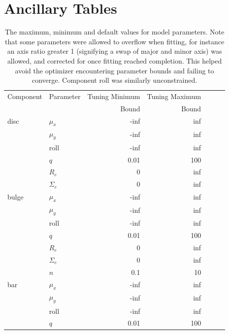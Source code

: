 \documentclass[../main.tex]{subfiles}
\begin{document}
\section{Ancillary Tables}
\begin{table}
  \centering
  \caption{The maximum, minimum and default values for model parameters. Note that some parameters were allowed to overflow when fitting, for instance an axis ratio greater 1 (signifying a swap of major and minor axis) was allowed, and corrected for once fitting reached completion. This helped avoid the optimizer encountering parameter bounds and failing to converge. Component roll was similarly unconstrained.}
  \begin{tabular}{l|l|r|r|r|r|r}
\hline
Component & Parameter  & Tuning Minimum & Tuning Maximum \\
          &            &  Bound         & Bound          \\
\hline
disc      & $\mu_x$    & -inf           & inf            \\
          & $\mu_y$    & -inf           & inf            \\
          & roll       & -inf           & inf            \\
          & $q$        & 0.01           & 100            \\
          & $R_e$      & 0              & inf            \\
          & $\Sigma_e$ & 0              & inf            \\
bulge     & $\mu_x$    & -inf           & inf            \\
          & $\mu_y$    & -inf           & inf            \\
          & roll       & -inf           & inf            \\
          & $q$        & 0.01           & 100            \\
          & $R_e$      & 0              & inf            \\
          & $\Sigma_e$ & 0              & inf            \\
          & $n$        & 0.1            & 10             \\
bar       & $\mu_x$    & -inf           & inf            \\
          & $\mu_y$    & -inf           & inf            \\
          & roll       & -inf           & inf            \\
          & $q$        & 0.01           & 100            \\

\end{tabular}
\end{table}
\end{document}

